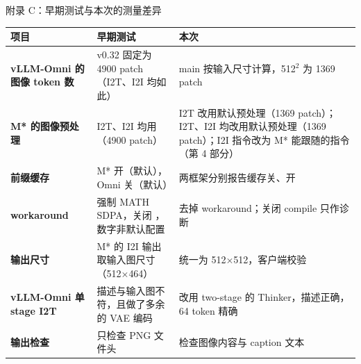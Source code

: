 \begin{frame}[t]{附录 C：早期测试与本次的测量差异}
\scriptsize\def\codesize{\relax}
\renewcommand{\arraystretch}{1.1}
\setlength{\tabcolsep}{3pt}
\begin{tabularx}{\textwidth}{>{\bfseries}p{3.0cm} p{4.2cm} Y}
\toprule
{}
项目 & 早期测试 & 本次 \\
\midrule
vLLM-Omni 的图像 token 数 & v0.32 固定为 4900 patch（I2T、I2I 均如此） & main 按输入尺寸计算，512$^2$ 为 1369 patch \\
M* 的图像预处理 & I2T、I2I 均用 （4900 patch） & I2T 改用默认预处理（1369 patch）；I2T、I2I 均改用默认预处理（1369 patch）；I2I 指令改为 M* 能跟随的指令（第 4 部分） \\
前缀缓存 & M* 开（默认），Omni 关（默认） & 两框架分别报告缓存关、开 \\
workaround & 强制 MATH SDPA，关闭 ，数字非默认配置 & 去掉 workaround；关闭 compile 只作诊断 \\
输出尺寸 & M* 的 I2I 输出取输入图尺寸（512$\times$464） & 统一为 512$\times$512，客户端校验 \\
vLLM-Omni 单 stage I2T & 描述与输入图不符，且做了多余的 VAE 编码 & 改用 two-stage 的 Thinker，描述正确，64 token 精确 \\
输出检查 & 只检查 PNG 文件头 & 检查图像内容与 caption 文本 \\
\bottomrule
\end{tabularx}
\vspace{2pt}
\end{frame}


